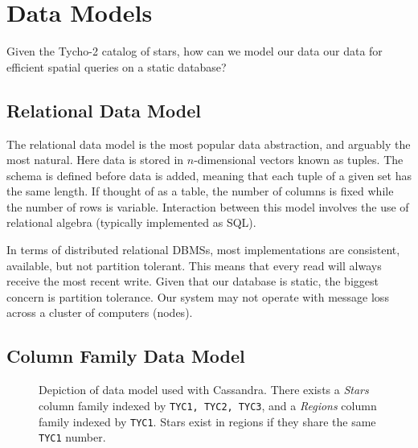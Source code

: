 \section{Data Models}\label{sec:dataModels}
Given the Tycho-2 catalog of stars, how can we model our data our data for efficient spatial queries on a static
database?

\subsection{Relational Data Model}\label{subsec:relationalDataModel}
The relational data model is the most popular data abstraction, and arguably the most natural.
Here data is stored in $n$-dimensional vectors known as tuples.
The schema is defined before data is added, meaning that each tuple of a given set has the same length.
If thought of as a table, the number of columns is fixed while the number of rows is variable.
Interaction between this model involves the use of relational algebra (typically implemented as SQL).

In terms of distributed relational DBMSs, most implementations are consistent, available, but not partition tolerant.
This means that every read will always receive the most recent write.
Given that our database is static, the biggest concern is partition tolerance.
Our system may not operate with message loss across a cluster of computers (nodes).

\subsection{Column Family Data Model}\label{subsec:columnFamilyDataModel}
\begin{figure}
    \caption{Depiction of data model used with Cassandra.
    There exists a \textit{Stars} column family indexed by \texttt{TYC1, TYC2, TYC3}, and a \textit{Regions} column
    family indexed by \texttt{TYC1}.
    Stars exist in regions if they share the same \texttt{TYC1} number.}
    \label{fig:cassandraDataModel}
\end{figure}

